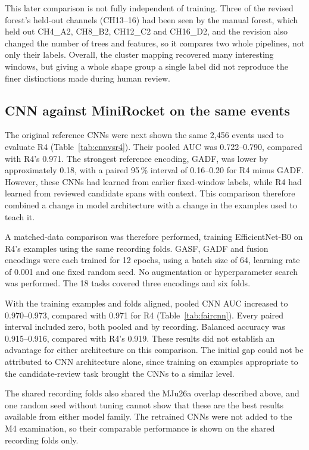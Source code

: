 This later comparison is not fully independent of training. Three of the revised forest's held-out channels (CH13--16) had been seen by the manual forest, which held out CH4\_A2, CH8\_B2, CH12\_C2 and CH16\_D2, and the revision also changed the number of trees and features, so it compares two whole pipelines, not only their labels. Overall, the cluster mapping recovered many interesting windows, but giving a whole shape group a single label did not reproduce the finer distinctions made during human review.


\subsection{CNN against MiniRocket on the same events}

The original reference CNNs were next shown the same 2,456 events used to evaluate R4 (Table~\ref{tab:cnnvsr4}). Their pooled AUC was 0.722--0.790, compared with R4's 0.971. The strongest reference encoding, GADF, was lower by approximately 0.18, with a paired 95\,\% interval of 0.16--0.20 for R4 minus GADF. However, these CNNs had learned from earlier fixed-window labels, while R4 had learned from reviewed candidate spans with context. This comparison therefore combined a change in model architecture with a change in the examples used to teach it.

A matched-data comparison was therefore performed, training EfficientNet-B0 on R4's examples using the same recording folds. GASF, GADF and fusion encodings were each trained for 12 epochs, using a batch size of 64, learning rate of 0.001 and one fixed random seed. No augmentation or hyperparameter search was performed. The 18 tasks covered three encodings and six folds.

With the training examples and folds aligned, pooled CNN AUC increased to 0.970--0.973, compared with 0.971 for R4 (Table~\ref{tab:faircnn}). Every paired interval included zero, both pooled and by recording. Balanced accuracy was 0.915--0.916, compared with R4's 0.919. These results did not establish an advantage for either architecture on this comparison. The initial gap could not be attributed to CNN architecture alone, since training on examples appropriate to the candidate-review task brought the CNNs to a similar level.

The shared recording folds also shared the MJu26a overlap described above, and one random seed without tuning cannot show that these are the best results available from either model family. The retrained CNNs were not added to the M4 examination, so their comparable performance is shown on the shared recording folds only.


